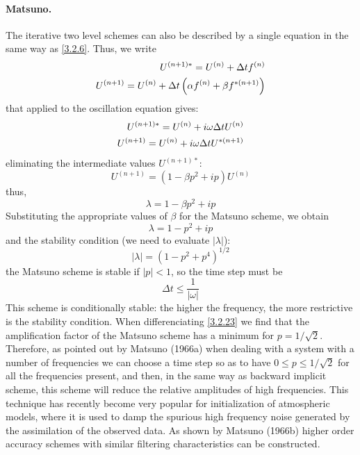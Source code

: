 \paragraph{Matsuno.}
The iterative two level schemes can also be described by a single equation in the same way as \ref{3.2.6}. Thus, we write
\begin{align}\label{3.2.18}
    U^{(n+1)*}=U^{(n)}+\Delta tf^{(n)}\notag \\
    U^{(n+1)}=U^{(n)}+\Delta t\left(\alpha f^{(n)}+\beta f^{*(n+1)}\right)
\end{align}
that applied to the oscillation equation gives:
\begin{align}
    U^{(n+1)*}=U^{(n)}+i\omega\Delta tU^{(n)} \notag \\
    U^{(n+1)}=U^{(n)}+i\omega\Delta tU^{*(n+1)}
\end{align}
eliminating the intermediate values $U^{(n+1)*}$:
$$U^{(n+1)}=\left(1-\beta p^2+ip\right)U^{(n)}$$
thus, 
\begin{equation}\label{3.2.20}
    \lambda=1-\beta p^2+ip
\end{equation}
Substituting the appropriate values of $\beta$ for the Matsuno scheme, we obtain
\begin{equation}\label{3.2.21}
    \lambda=1-p^2+ip
\end{equation}
and the stability condition (we need to evaluate $|\lambda|$): 
\begin{equation}\label{3.2.23}
    |\lambda|=\left(1-p^2+p^4\right)^{1/2}
\end{equation}
the Matsuno scheme is stable if $|p|<1$, so the time step must be $$\Delta t\leq\frac{1}{|\omega|}$$
This scheme is conditionally stable: the higher the frequency, the more restrictive is the stability condition. When differenciating \ref{3.2.23} we find that the amplification factor of the Matsuno scheme has a minimum for $p=1/\sqrt{2}$. Therefore, as pointed out by Matsuno (1966a) when dealing with a system with a number of frequencies we can choose a time step so as to have $0\leq p\leq 1/\sqrt{2}$ for all the frequencies present, and then, in the same way as backward implicit scheme, this scheme will reduce the relative amplitudes of high frequencies. This technique has recently become very popular for initialization of atmospheric models, where it is used to damp the spurious high frequency noise generated by the assimilation of the observed data. As shown by Matsuno (1966b) higher order accuracy schemes with similar filtering characteristics can be constructed.
